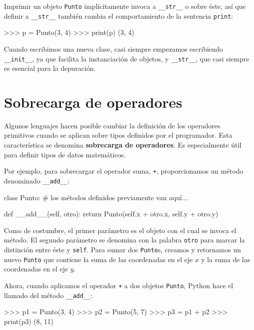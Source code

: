 Imprimir un objeto \texttt{Punto} implícitamente invoca a \texttt{\_\_str\_\_}
o sobre éste, así que definir a \texttt{\_\_str\_\_} también cambia
el comportamiento de la sentencia \texttt{print}:
\begin{pyconcode}
>>> p = Punto(3, 4)
>>> print(p)
(3, 4)
\end{pyconcode}

Cuando escribimos una nueva clase, casi siempre empezamos escribiendo
\texttt{\_\_init\_\_}, ya que facilita la instanciación de objetos,
y \texttt{\_\_str\_\_}, que casi siempre es esencial para la depuración.

\section{Sobrecarga de operadores}

\label{operator overloading}  
 

Algunos lenguajes hacen posible cambiar la definición de los operadores
primitivos cuando se aplican sobre tipos definidos por el programador.
Esta característica se denomina \textbf{sobrecarga de operadores}.
Es especialmente útil para definir tipos de datos matemáticos.

Por ejemplo, para sobrecargar el operador suma, \texttt{+}, proporcionamos
un método denominado \texttt{\_\_add\_\_}:
\begin{pythoncode}
class Punto:
  # los métodos definidos previamente van aquí...

  def __add__(self, otro):
    return Punto(self.x + otro.x, self.y + otro.y)
\end{pythoncode}

Como de costumbre, el primer parámetro es el objeto con el cual se
invoca el método. El segundo parámetro se denomina con la palabra
\texttt{otro} para marcar la distinción entre éste y \texttt{self}.
Para sumar dos \texttt{Punto}s, creamos y retornamos un nuevo \texttt{Punto}
que contiene la suma de las coordenadas en el eje $x$ y la suma de
las coordenadas en el eje $y$.

Ahora, cuando aplicamos el operador \texttt{+} a dos objetos \texttt{Punto},
Python hace el llamado del método \texttt{\_\_add\_\_}:
\begin{pyconcode}
>>>   p1 = Punto(3, 4)
>>>   p2 = Punto(5, 7)
>>>   p3 = p1 + p2
>>>   print(p3)
(8, 11)
\end{pyconcode}

